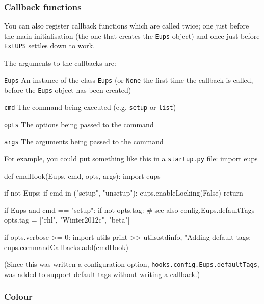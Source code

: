 \documentclass{article}
\newcommand{\code}[1]{\texttt{#1}}
\newcommand{\file}[1]{\texttt{#1}}
\newcommand{\eups}{\code{ExtUPS}\xspace}
\let\overbatim=\verbatim
\let\oendverbatim=\endverbatim
\renewenvironment{verbatim}
{\center\minipage{16cm}\overbatim}
{\oendverbatim\endminipage\endcenter}
\begin{document}
\subsubsection{Callback functions}
\label{commandCallbacks}

You can also register callback functions which are called twice; one just before the main initialisation (the
one that creates the \code{Eups} object) and once just before \eups settles down to work.

The arguments to the callbacks are:
\begin{description}
  \item \code{Eups}
    An instance of the class \code{Eups} (or \code{None} the first time the callback is called, before
    the \code{Eups} object has been created)

  \item \code{cmd}
    The command being executed (e.g. \code{setup} or \code{list})

  \item \code{opts}
    The options being passed to the command

  \item \code{args}
    The arguments being passed to the command
\end{description}

For example, you could put something like this in a \file{startup.py} file:
\begin{verbatim}
import eups

def cmdHook(Eups, cmd, opts, args):
    import eups

    if not Eups:
        if cmd in ("setup", "unsetup"):
            eups.enableLocking(False)
        return

    if Eups and cmd == "setup":
        if not opts.tag:              # see also config.Eups.defaultTags
            opts.tag = ["rhl", "Winter2012c", "beta"]

            if opts.verbose >= 0:
                import utils
                print >> utils.stdinfo, "Adding default tags: %s" % (", ".join(opts.tag))
eups.commandCallbacks.add(cmdHook)
\end{verbatim}

(Since this was written a configuration option, \code{hooks.config.Eups.defaultTags}, was added
to support default tags without writing a callback.)

\subsubsection{Colour}
\label{color}
\end{document}
